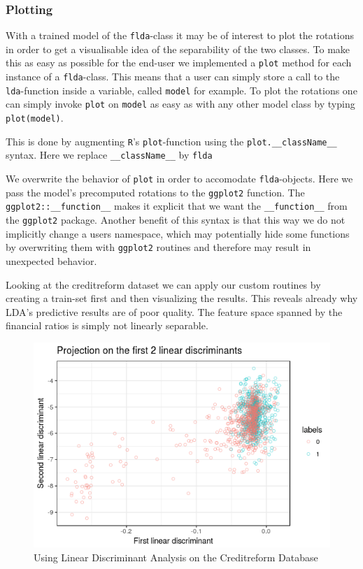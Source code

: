 \documentclass{article}
\begin{document}
\subsubsection{Plotting}

With a trained model of the \texttt{flda}-class it may be of interest to plot the rotations in order to get a visualisable idea of the separability of the two classes. To make this as easy as possible for the end-user we implemented a \texttt{plot} method for each instance of a \texttt{flda}-class. This means that a user can simply store a call to the \texttt{lda}-function inside a variable, called \texttt{model} for example. To plot the rotations one can simply invoke \texttt{plot} on \texttt{model} as easy as with any other model class by typing \texttt{plot(model)}.

This is done by augmenting \texttt{R}'s \texttt{plot}-function using the \texttt{plot.\_\_className\_\_} syntax. Here we replace \texttt{\_\_className\_\_} by \texttt{flda}



We overwrite the behavior of \texttt{plot} in order to accomodate \texttt{flda}-objects. Here we pass the model's precomputed rotations to the \texttt{ggplot2} function. The \texttt{ggplot2::\_\_function\_\_} makes it explicit that we want the \texttt{\_\_function\_\_} from the \texttt{ggplot2} package. Another benefit of this syntax is that this way we do not implicitly change a users namespace, which may potentially hide some functions by overwriting them with \texttt{ggplot2} routines and therefore may result in unexpected behavior.

Looking at the creditreform dataset we can apply our custom routines by creating a train-set first and then visualizing the results. This reveals already why LDA's predictive results are of poor quality. The feature space spanned by the financial ratios is simply not linearly separable.




\begin{figure}
\caption{Using Linear Discriminant Analysis on the Creditreform Database}
\centering
\includegraphics{../LDA/creditLDA.png}
\end{figure}
\end{document}
